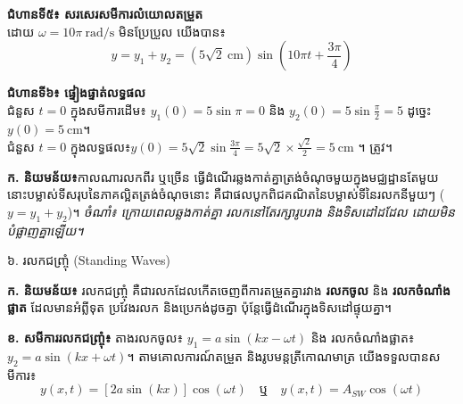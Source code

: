 \noindent
\textbf{ជំហានទី៥៖ សរសេរសមីការលំយោលតម្រួត}\\
ដោយ $\omega = 10\pi\ \mathrm{rad/s}$
មិនប្រែប្រួល យើងបាន៖
\begin{equation*}
	\boxed{\,y = y_1 + y_2 =
		\left(5\sqrt{2}\ \mathrm{cm}\right)\sin
		\left(10\pi t + \frac{3\pi}{4}\right)\,}
\end{equation*}

\noindent \textbf{ជំហានទី៦៖ ផ្ទៀងផ្ទាត់លទ្ធផល}\\
ជំនួស $t = 0$ ក្នុងសមីការដើម៖
$y_1(0) = 5\sin\pi = 0$ និង
$y_2(0) = 5\sin\frac{\pi}{2} = 5$ ដូច្នេះ
$y(0) = 5\ \mathrm{cm}$។\\
ជំនួស $t = 0$ ក្នុងលទ្ធផល៖$
y(0) = 5\sqrt{2}\sin\frac{3\pi}{4} = 5\sqrt{2}
\times \frac{\sqrt{2}}{2} = 5\ \mathrm{cm}$
។ ត្រូវ។



\textbf{ក. និយមន័យ៖}កាលណារលកពីរ ឬច្រើន
ធ្វើដំណើរឆ្លងកាត់គ្នាត្រង់ចំណុចមួយក្នុងមជ្ឈដ្ឋានតែមួយ
នោះបម្លាស់ទីសរុបនៃភាគល្អិតត្រង់ចំណុចនោះ
គឺជាផលបូកពិជគណិតនៃបម្លាស់ទីនៃរលកនីមួយៗ (
$y = y_1 + y_2$)។
\textit
{ចំណាំ៖ ក្រោយពេលឆ្លងកាត់គ្នា រលកនៅតែរក្សារូបរាង
និងទិសដៅដដែល ដោយមិនបំផ្លាញគ្នាឡើយ។}

\khmertopic
{៦. រលកជញ្ច្រុំ ({\englishfont Standing Waves})}

\textbf{ក. និយមន័យ៖}
រលកជញ្ច្រុំ គឺជារលកដែលកើតចេញពីការតម្រួតគ្នារវាង
\textbf{រលកចូល} និង \textbf{រលកចំណាំងផ្លាត}
ដែលមានអំព្លីទុត ប្រវែងរលក និងប្រេកង់ដូចគ្នា
ប៉ុន្តែធ្វើដំណើរក្នុងទិសដៅផ្ទុយគ្នា។

\textbf{ខ. សមីការរលកជញ្ច្រុំ៖}
តាងរលកចូល៖ $y_1 = a \sin(kx - \omega t)$
និង រលកចំណាំងផ្លាត៖ $y_2 = a \sin(kx + \omega t)$។
តាមគោលការណ៍តម្រួត និងរូបមន្តត្រីកោណមាត្រ
យើងទទួលបានសមីការ៖
\begin{equation}
	y(x,t) = [2a \sin(kx)] \cos(\omega t) \quad
	\text{ឬ} \quad y(x,t) = A_{SW} \cos(\omega t)
\end{equation}

